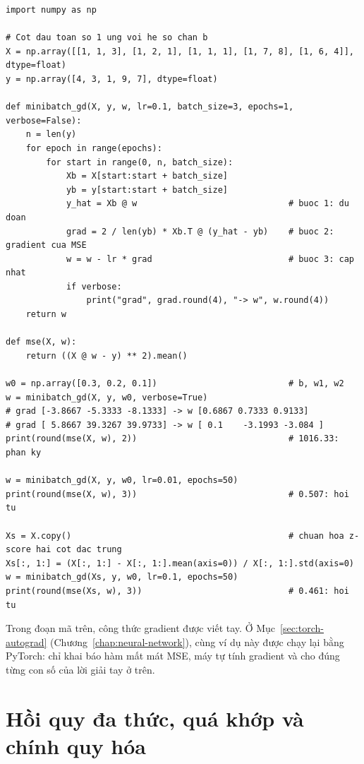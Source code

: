 \begin{lstlisting}[caption={Mini-batch Gradient Descent dạng ma trận cho hồi quy tuyến tính}]
import numpy as np

# Cot dau toan so 1 ung voi he so chan b
X = np.array([[1, 1, 3], [1, 2, 1], [1, 1, 1], [1, 7, 8], [1, 6, 4]], dtype=float)
y = np.array([4, 3, 1, 9, 7], dtype=float)

def minibatch_gd(X, y, w, lr=0.1, batch_size=3, epochs=1, verbose=False):
    n = len(y)
    for epoch in range(epochs):
        for start in range(0, n, batch_size):
            Xb = X[start:start + batch_size]
            yb = y[start:start + batch_size]
            y_hat = Xb @ w                              # buoc 1: du doan
            grad = 2 / len(yb) * Xb.T @ (y_hat - yb)    # buoc 2: gradient cua MSE
            w = w - lr * grad                           # buoc 3: cap nhat
            if verbose:
                print("grad", grad.round(4), "-> w", w.round(4))
    return w

def mse(X, w):
    return ((X @ w - y) ** 2).mean()

w0 = np.array([0.3, 0.2, 0.1])                          # b, w1, w2
w = minibatch_gd(X, y, w0, verbose=True)
# grad [-3.8667 -5.3333 -8.1333] -> w [0.6867 0.7333 0.9133]
# grad [ 5.8667 39.3267 39.9733] -> w [ 0.1    -3.1993 -3.084 ]
print(round(mse(X, w), 2))                              # 1016.33: phan ky

w = minibatch_gd(X, y, w0, lr=0.01, epochs=50)
print(round(mse(X, w), 3))                              # 0.507: hoi tu

Xs = X.copy()                                           # chuan hoa z-score hai cot dac trung
Xs[:, 1:] = (X[:, 1:] - X[:, 1:].mean(axis=0)) / X[:, 1:].std(axis=0)
w = minibatch_gd(Xs, y, w0, lr=0.1, epochs=50)
print(round(mse(Xs, w), 3))                             # 0.461: hoi tu
\end{lstlisting}

\noindent Trong đoạn mã trên, công thức gradient được viết tay. Ở Mục~\ref{sec:torch-autograd} (Chương~\ref{chap:neural-network}), cùng ví dụ này được chạy lại bằng PyTorch: chỉ khai báo hàm mất mát MSE, máy tự tính gradient và cho đúng từng con số của lời giải tay ở trên.

\section{Hồi quy đa thức, quá khớp và chính quy hóa}

